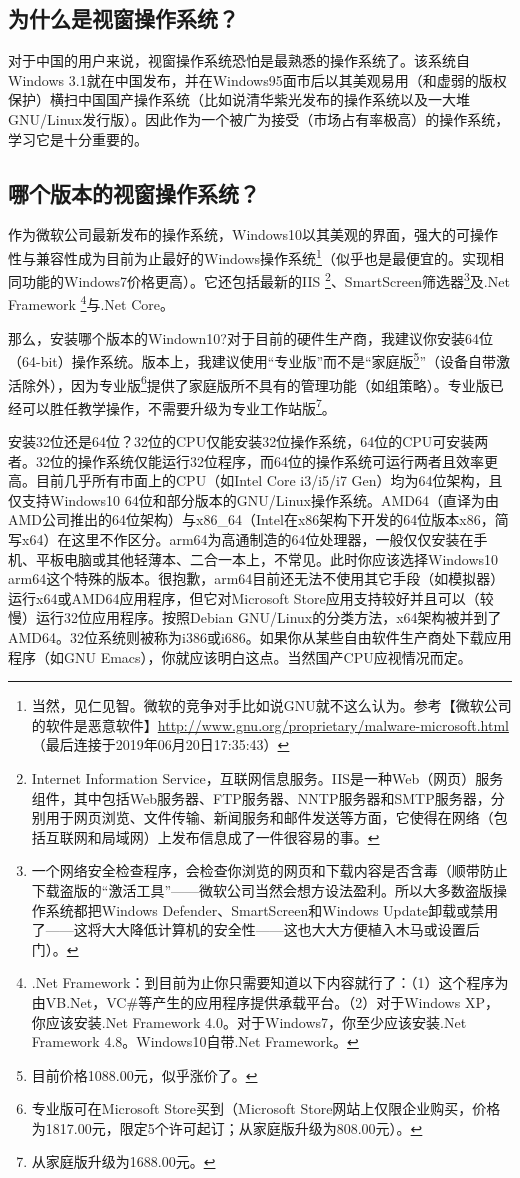 \subsection{为什么是视窗操作系统？}
对于中国的用户来说，视窗操作系统恐怕是最熟悉的操作系统了。该系统自Windows 3.1就在中国发布，并在Windows95面市后以其美观易用（和虚弱的版权保护）横扫中国国产操作系统（比如说清华紫光发布的操作系统以及一大堆GNU/Linux发行版）。因此作为一个被广为接受（市场占有率极高）的操作系统，学习它是十分重要的。

\subsection{哪个版本的视窗操作系统？}
作为微软公司最新发布的操作系统，Windows10以其美观的界面，强大的可操作性与兼容性成为目前为止最好的Windows操作系统\footnote{当然，见仁见智。微软的竞争对手比如说GNU就不这么认为。参考【微软公司的软件是恶意软件】\url{http://www.gnu.org/proprietary/malware-microsoft.html}（最后连接于2019年06月20日17:35:43）}（似乎也是最便宜的。实现相同功能的Windows7价格更高）。它还包括最新的IIS \footnote{Internet Information Service，互联网信息服务。IIS是一种Web（网页）服务组件，其中包括Web服务器、FTP服务器、NNTP服务器和SMTP服务器，分别用于网页浏览、文件传输、新闻服务和邮件发送等方面，它使得在网络（包括互联网和局域网）上发布信息成了一件很容易的事。\cite{iisinfo}}、SmartScreen筛选器\footnote{一个网络安全检查程序，会检查你浏览的网页和下载内容是否含毒（顺带防止下载盗版的“激活工具”——微软公司当然会想方设法盈利。所以大多数盗版操作系统都把Windows Defender、SmartScreen和Windows Update卸载或禁用了——这将大大降低计算机的安全性——这也大大方便植入木马或设置后门）。}及.Net Framework \footnote{.Net Framework：到目前为止你只需要知道以下内容就行了：（1）这个程序为由VB.Net，VC\#等产生的应用程序提供承载平台。（2）对于Windows XP，你应该安装.Net Framework 4.0。对于Windows7，你至少应该安装.Net Framework 4.8。Windows10自带.Net Framework。}与.Net Core。\par 
那么，安装哪个版本的Windown10?对于目前的硬件生产商，我建议你安装64位（64-bit）操作系统。版本上，我建议使用“专业版”而不是“家庭版\footnote{目前价格1088.00元，似乎涨价了。}”（设备自带激活除外），因为专业版\footnote{专业版可在Microsoft Store买到（Microsoft Store网站上仅限企业购买，价格为1817.00元，限定5个许可起订；从家庭版升级为808.00元）。}提供了家庭版所不具有的管理功能（如组策略）。专业版已经可以胜任教学操作，不需要升级为专业工作站版\footnote{从家庭版升级为1688.00元。}。\par
安装32位还是64位？32位的CPU仅能安装32位操作系统，64位的CPU可安装两者。32位的操作系统仅能运行32位程序，而64位的操作系统可运行两者且效率更高。目前几乎所有市面上的CPU（如Intel Core i3/i5/i7  Gen）均为64位架构，且仅支持Windows10 64位和部分版本的GNU/Linux操作系统。AMD64（直译为由AMD公司推出的64位架构）与x86\_64（Intel在x86架构下开发的64位版本x86，简写x64）在这里不作区分。arm64为高通制造的64位处理器，一般仅仅安装在手机、平板电脑或其他轻薄本、二合一本上，不常见。此时你应该选择Windows10 arm64这个特殊的版本。很抱歉，arm64目前还无法不使用其它手段（如模拟器）运行x64或AMD64应用程序，但它对Microsoft Store应用支持较好并且可以（较慢）运行32位应用程序。按照Debian GNU/Linux的分类方法，x64架构被并到了AMD64。32位系统则被称为i386或i686。如果你从某些自由软件生产商处下载应用程序（如GNU Emacs），你就应该明白这点。当然国产CPU应视情况而定。\par

